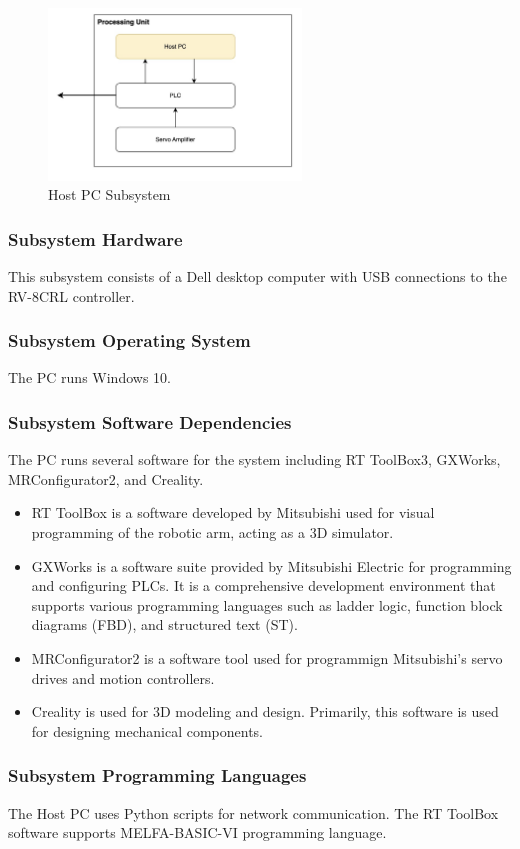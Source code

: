 \begin{figure}[h!]
	\centering
 	\includegraphics[width=0.6\textwidth]{images/HostPC.jpg}
 \caption{Host PC Subsystem}
\end{figure}

\subsubsection{Subsystem Hardware}
This subsystem consists of a Dell desktop computer with USB connections to the RV-8CRL controller. 
\subsubsection{Subsystem Operating System}
The PC runs Windows 10.
\subsubsection{Subsystem Software Dependencies}
The PC runs several software for the system including RT ToolBox3, GXWorks, MRConfigurator2, and Creality.
\begin{itemize}
    \item RT ToolBox is a software developed by Mitsubishi used for visual programming of the robotic arm, acting as a 3D simulator.
    \item GXWorks is a software suite provided by Mitsubishi Electric for programming and configuring PLCs. It is a comprehensive development environment that supports various programming languages such as ladder logic, function block diagrams (FBD), and structured text (ST).
    \item MRConfigurator2 is a software tool used for programmign Mitsubishi's servo drives and motion controllers.
    \item Creality is used for 3D modeling and design. Primarily, this software is used for designing mechanical components.
\end{itemize}

\subsubsection{Subsystem Programming Languages}
The Host PC uses Python scripts for network communication. The RT ToolBox software supports MELFA-BASIC-VI programming language.

